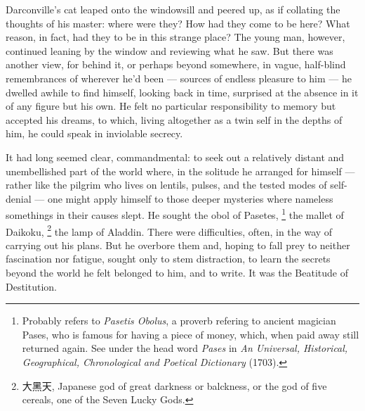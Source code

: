 Darconville's cat leaped onto the windowsill and peered 
up, as if collating
the thoughts of his master: where were they? How had they come to be here? What
reason, in fact, had they to be in this strange place? The young man, however,
continued leaning by the window and reviewing what he saw. But there was another
view, for behind it, or perhaps beyond somewhere, in vague, half-blind
remembrances of wherever he'd been --- sources of endless pleasure to him 
--- he dwelled awhile to find himself, looking back in time, surprised at the 
absence in it of
any figure but his own. He felt no particular responsibility to memory but
accepted his dreams, to which, living altogether as a twin self in the depths of
him, he could speak in inviolable secrecy.

  It had long seemed clear, commandmental: to seek out a relatively distant and
unembellished 
part of the world where, in the solitude he arranged for
himself ---rather like the pilgrim who lives on lentils, 
pulses, 
and the tested modes of self-denial --- one might apply himself to those deeper 
mysteries where nameless somethings in their causes slept. He sought the obol 
of Pasetes, 
\footnote{\textdbend Probably refers to \textit{Pasetis Obolus}, a proverb refering
to ancient magician Pases, who is famous for having a piece of money, which, when
paid away still returned again. See under the head word \textit{Pases} in 
\textit{An Universal, Historical, Geographical, Chronological and Poetical Dictionary} (1703).
}
the mallet 
of Daikoku, 
  \footnote{大黑天, Japanese god of great darkness or balckness, or the god of 
five cereals, one of the Seven Lucky Gods.}
the lamp of Aladdin. There were difficulties, often, in the
way of carrying out his plans. But he overbore them and, hoping to fall prey to
neither fascination nor fatigue, sought only to stem 
distraction, to learn the
secrets beyond the world he felt belonged to him, and to write. It was the
Beatitude 
of Destitution.

